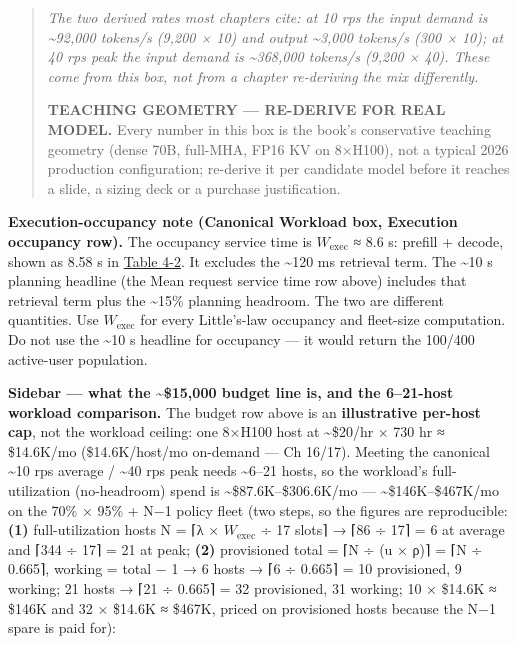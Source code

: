 \begin{quote}
\emph{The two derived rates most chapters cite: at 10 rps the input
demand is \textasciitilde92,000 tokens/s (9,200 × 10) and output
\textasciitilde3,000 tokens/s (300 × 10); at 40 rps peak the input
demand is \textasciitilde368,000 tokens/s (9,200 × 40). These come from
this box, not from a chapter re-deriving the mix differently.}

\textbf{TEACHING GEOMETRY --- RE-DERIVE FOR REAL MODEL.} Every number in
this box is the book's conservative teaching geometry (dense 70B,
full-MHA, FP16 KV on 8×H100), not a typical 2026 production
configuration; re-derive it per candidate model before it reaches a
slide, a sizing deck or a purchase justification.
\end{quote}

\textbf{Execution-occupancy note (Canonical Workload box, Execution
occupancy row).} The occupancy service time is \(W_{\mathrm{exec}}\) ≈
8.6 s: prefill + decode, shown as 8.58 s in \hyperref[tab:4.2]{Table 4-2}. It excludes the
\textasciitilde120 ms retrieval term. The \textasciitilde10 s planning
headline (the Mean request service time row above) includes that
retrieval term plus the \textasciitilde15\% planning headroom. The two
are different quantities. Use \(W_{\mathrm{exec}}\) for every
Little's-law occupancy and fleet-size computation. Do not use the
\textasciitilde10 s headline for occupancy --- it would return the
100/400 active-user population.

\textbf{Sidebar --- what the \textasciitilde\$15,000 budget line is, and
the 6--21-host workload comparison.} The budget row above is an
\textbf{illustrative per-host cap}, not the workload ceiling: one 8×H100
host at \textasciitilde\$20/hr × 730 hr ≈ \$14.6K/mo (\$14.6K/host/mo
on-demand --- Ch 16/17). Meeting the canonical \textasciitilde10 rps
average / \textasciitilde40 rps peak needs \textasciitilde6--21 hosts,
so the workload's full-utilization (no-headroom) spend is
\textasciitilde\$87.6K--\$306.6K/mo --- \textasciitilde\$146K--\$467K/mo
on the 70\% × 95\% + N−1 policy fleet (two steps, so the figures are
reproducible: \textbf{(1)} full-utilization hosts N = ⌈λ ×
\(W_{\mathrm{exec}}\) ÷ 17 slots⌉ → ⌈86 ÷ 17⌉ = 6 at average and ⌈344 ÷
17⌉ = 21 at peak; \textbf{(2)} provisioned total = ⌈N ÷ (u × ρ)⌉ = ⌈N ÷
0.665⌉, working = total − 1 → 6 hosts → ⌈6 ÷ 0.665⌉ = 10 provisioned, 9
working; 21 hosts → ⌈21 ÷ 0.665⌉ = 32 provisioned, 31 working; 10 ×
\$14.6K ≈ \$146K and 32 × \$14.6K ≈ \$467K, priced on provisioned hosts
because the N−1 spare is paid for):

